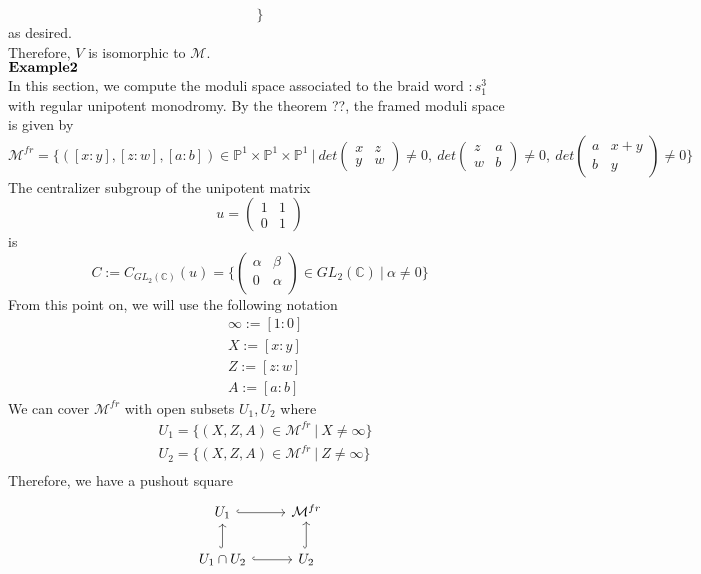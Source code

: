 \begin{example}
\[	\}
\]
as desired.\\
Therefore, $V$ is isomorphic to $\mathcal{M}$.
\bigskip\\
$\bf{Example2}$\\
In this section, we compute the moduli space associated to the braid word $:s_1^3$ with regular unipotent monodromy. By the theorem ??, the framed moduli space is given by
\[
	\mathcal{M}^{fr}=\{
	([x:y],[z:w],[a:b])\in \mathbb{P}^1 \times \mathbb{P}^1\times \mathbb{P}^1~|~
	det	
	\begin{pmatrix}
	x&z\\
	y&w
	\end{pmatrix}
	\neq 0,~
	det	
	\begin{pmatrix}
	z&a\\
	w&b
	\end{pmatrix}
	\neq 0,~
	det	
	\begin{pmatrix}
	a&x+y\\
	b&y
	\end{pmatrix}
	\neq 0	 	
	\}
\]
The centralizer subgroup of the unipotent matrix
\[u=
	\begin{pmatrix}
		1&1\\
		0&1
	\end{pmatrix}
\] 
is
\[
	C:=C_{GL_2(\mathbb{C})}(u)=
	\{
	\begin{pmatrix}
	\alpha&\beta\\
	0&\alpha\\
	\end{pmatrix}
	\in GL_2(\mathbb{C})~|~
	\alpha \neq 0
	\}
\]
From this point on, we will use the following notation 
\begin{align*}
 &\infty:=[1:0]\\
 &X:=[x:y]\\
 &Z:=[z:w]\\
 &A:=[a:b] 
\end{align*}
We can cover $\mathcal{M}^{fr}$ with open subsets $U_1,U_2$ where 
\begin{align*}
	&U_{1}=\{
	(X,Z,A)\in \mathcal{M}^{fr}~|~X\neq \infty\}\\
	&U_{2}=\{
	(X,Z,A)\in \mathcal{M}^{fr}~|~Z\neq \infty\}\\	
\end{align*}
Therefore, we have a pushout square
\begin{displaymath}
\begin{tikzcd}
  U_1\arrow[hookrightarrow]{r} & \mathcal{M}^{fr} \\
  U_1 \cap U_2 \arrow[hookrightarrow]{u} \arrow[r,hookrightarrow] & U_2 \arrow[hookrightarrow]{u} 

\end{tikzcd}
\end{displaymath}
\end{example}
